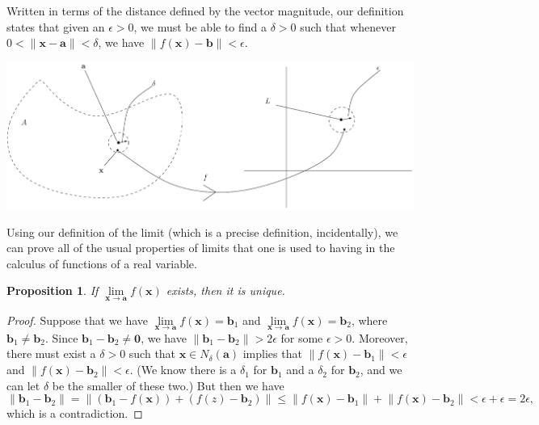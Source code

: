 \documentclass[12pt,letterpaper]{article}
\newtheorem{proposition}[theorem]{Proposition}
\newcommand{\len}[1]{\lVert#1\rVert}
\newcommand{\x}{\mathbf{x}}
\begin{document}
Written in terms of the distance defined by the vector magnitude, our definition states that given an $\epsilon>0$,  we must be able to find a $\delta>0$ such that whenever $0<\len{\x-\mathbf{a}}<\delta$, we have $\len{f(\x)-\mathbf{b}}<\epsilon$.
\begin{center}
 \includegraphics[width=6.5in]{limit.pdf}
\end{center}
Using our definition of the limit (which is a precise definition, incidentally), we can prove all of the usual properties of limits that one is used to having in the calculus of functions of a real variable.
\begin{proposition}
 If $\lim\limits_{\x\to \mathbf{a}} f(\x)$ exists, then it is unique.
\end{proposition}
\begin{proof}
 Suppose that we have $\lim\limits_{\x\to \mathbf{a}} f(\x)=\mathbf{b}_1$ and $\lim\limits_{\x\to \mathbf{a}} f(\x)=\mathbf{b}_2$, where $\mathbf{b}_1\neq \mathbf{b}_2$.  Since $\mathbf{b}_1-\mathbf{b}_2\neq \mathbf{0}$, we have $\len{\mathbf{b}_1-\mathbf{b}_2}>2\epsilon$ for some $\epsilon>0$.  Moreover, there must exist a $\delta>0$ such that $\x\in N_\delta(\mathbf{a})$ implies that $\len{f(\x)-\mathbf{b}_1}<\epsilon$ and $\len{f(\x)-\mathbf{b}_2}<\epsilon$.  (We know there is a $\delta_1$ for $\mathbf{b}_1$ and a $\delta_2$ for $\mathbf{b}_2$, and we can let $\delta$ be the smaller of these two.)  But then we have
\[
 \len{\mathbf{b}_1-\mathbf{b}_2} = \len{(\mathbf{b}_1-f(\x))+(f(z)-\mathbf{b}_2)}\leq \len{f(\x)-\mathbf{b}_1}+\len{f(\x)-\mathbf{b}_2}<\epsilon+\epsilon = 2\epsilon,
\]
which is a contradiction.
\end{proof}
\end{document}
